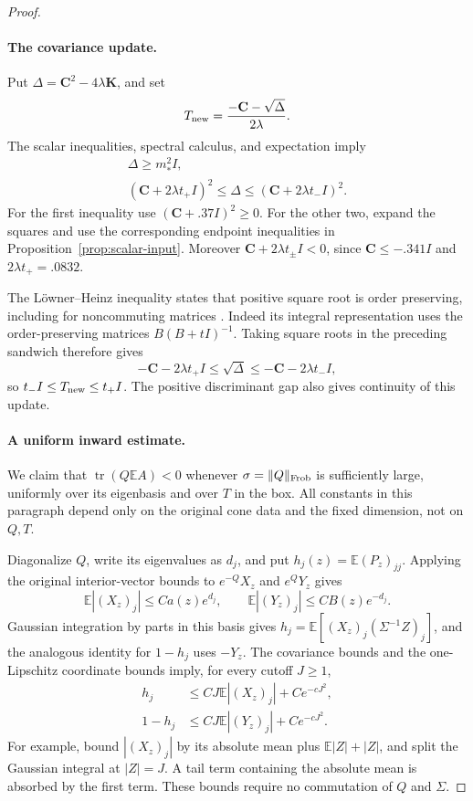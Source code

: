 \begin{proof}
\paragraph{The covariance update.}
Put \(\Delta=\mathbf C^2-4\lambda\mathbf K\), and set
\[
T_{\rm new}=\frac{-\mathbf C-\sqrt\Delta}{2\lambda}.
\]
The scalar inequalities, spectral calculus, and expectation imply
\[
\begin{gathered}
\Delta\ge m_*^2I,\\
(\mathbf C+2\lambda t_+I)^2\le\Delta
\le(\mathbf C+2\lambda t_-I)^2.
\end{gathered}
\]
For the first inequality use \((\mathbf C+.37I)^2\ge0\). For the other two, expand the squares and use the corresponding endpoint inequalities in Proposition~\ref{prop:scalar-input}. Moreover \(\mathbf C+2\lambda t_\pm I<0\), since \(\mathbf C\le-.341I\) and \(2\lambda t_+=.0832\).

The L\"owner--Heinz inequality states that positive square root is order
preserving, including for noncommuting matrices
\cite[Theorem~2.3]{Chansangiam2013}. Indeed its integral representation uses the order-preserving matrices \(B(B+tI)^{-1}\). Taking square roots in the preceding sandwich therefore gives
\[
-\mathbf C-2\lambda t_+I\le\sqrt\Delta
\le-\mathbf C-2\lambda t_-I,
\]
so \(t_-I\le T_{\rm new}\le t_+I\). The positive discriminant gap also gives continuity of this update.

\paragraph{A uniform inward estimate.}
We claim that
\(\operatorname{tr}(Q\mathbb EA)<0\) whenever \(\sigma=\|Q\|_{\rm Frob}\) is sufficiently large, uniformly over its eigenbasis and over \(T\) in the box. All constants in this paragraph depend only on the original cone data and the fixed dimension, not on \(Q,T\).

Diagonalize \(Q\), write its eigenvalues as \(d_j\), and put \(h_j(z)=\mathbb E(P_z)_{jj}\). Applying the original interior-vector bounds to \(e^{-Q}X_z\) and \(e^QY_z\) gives
\[
\mathbb E|(X_z)_j|\le Ca(z)e^{d_j},\qquad
\mathbb E|(Y_z)_j|\le CB(z)e^{-d_j}.
\]
Gaussian integration by parts in this basis gives
\(h_j=\mathbb E[(X_z)_j(\Sigma^{-1}Z)_j]\), and the analogous identity for \(1-h_j\) uses \(-Y_z\). The covariance bounds and the one-Lipschitz coordinate bounds imply, for every cutoff \(J\ge1\),
\[
\begin{aligned}
h_j&\le CJ\mathbb E|(X_z)_j|+Ce^{-cJ^2},\\
1-h_j&\le CJ\mathbb E|(Y_z)_j|+Ce^{-cJ^2}.
\end{aligned}
\]
For example, bound \(|(X_z)_j|\) by its absolute mean plus \(\mathbb E|Z|+|Z|\), and split the Gaussian integral at \(|Z|=J\). A tail term containing the absolute mean is absorbed by the first term. These bounds require no commutation of \(Q\) and \(\Sigma\).


\end{proof}
